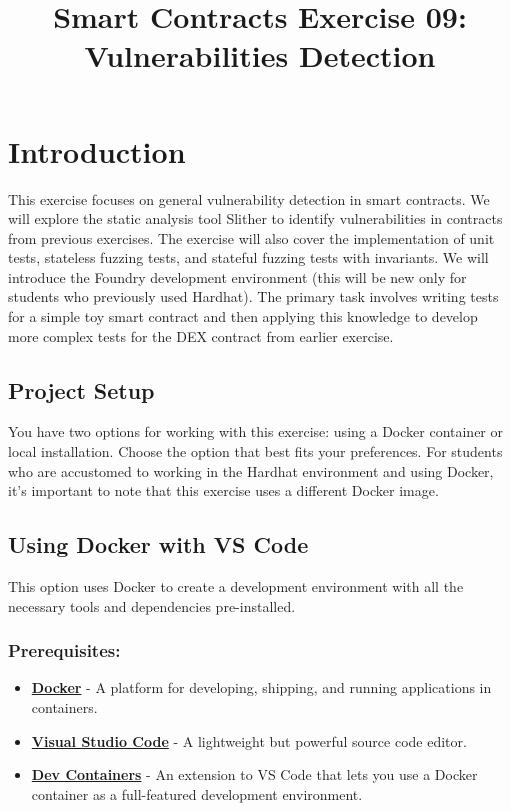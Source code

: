\documentclass[12pt]{article}
\title{Smart Contracts Exercise 09: \\ Vulnerabilities Detection}
\author{}
\date{}
\begin{document}
\maketitle
\section{Introduction}

This exercise focuses on general vulnerability detection in smart contracts. We will explore the static analysis tool Slither to identify vulnerabilities in contracts from previous exercises. The exercise will also cover the
implementation of unit tests, stateless fuzzing tests, and stateful fuzzing
tests with invariants. We will introduce the Foundry development environment
(this will be new only for students who previously used Hardhat). The primary
task involves writing tests for a simple toy smart contract and then applying
this knowledge to develop more complex tests for the DEX contract from earlier
exercise.

\subsection*{Project Setup}

You have two options for working with this exercise: using a Docker container
or local installation. Choose the option that best fits your preferences. For
students who are accustomed to working in the Hardhat environment and using
Docker, it's important to note that this exercise uses a different Docker
image.

\subsection{Using Docker with VS Code}

This option uses Docker to create a development environment with all the
necessary tools and dependencies pre-installed.

\subsubsection*{Prerequisites:}

\begin{itemize}
    \item \textbf{\href{https://www.docker.com/products/docker-desktop}{Docker}} - A platform for developing, shipping, and running applications in containers.
    \item \textbf{\href{https://code.visualstudio.com/}{Visual Studio Code}} - A lightweight but powerful source code editor.
    \item \textbf{\href{https://marketplace.visualstudio.com/items?itemName=ms-vscode-remote.remote-containers}{Dev Containers}} - An extension to VS Code that lets you use a Docker container as a full-featured development environment.
\end{itemize}
\end{document}
